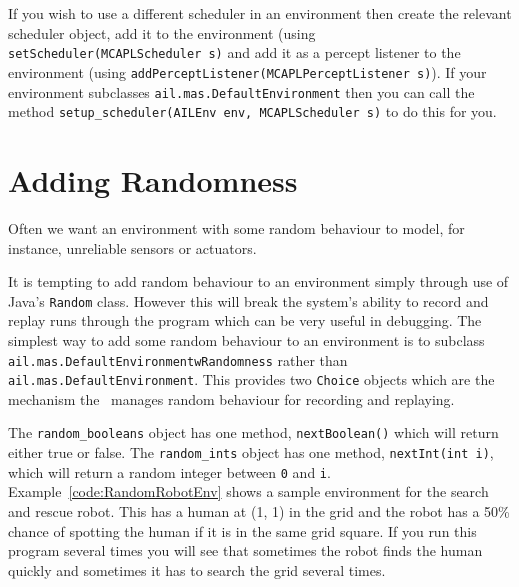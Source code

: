 \begin{sloppypar}
If you wish to use a different scheduler in an environment then create the relevant scheduler object, add it to the environment (using \texttt{setScheduler(MCAPLScheduler s)} and add it as a percept listener to the environment (using \texttt{addPerceptListener(MCAPLPerceptListener s)}).  If your environment subclasses \texttt{ail.mas.DefaultEnvironment} then you can call the method \texttt{setup\_scheduler(AILEnv env, MCAPLScheduler s)} to do this for you.
\end{sloppypar}

\section{Adding Randomness}

Often we want an environment with some random behaviour to model, for instance, unreliable sensors or actuators.

\begin{sloppypar}
It is tempting to add random behaviour to an environment simply through use of Java's \texttt{Random} class.  However this will break the system's ability to record and replay runs through the program which can be very useful in debugging.  The simplest way to add some random behaviour to an environment is to subclass \texttt{ail.mas.DefaultEnvironmentwRandomness} rather than \texttt{ail.mas.DefaultEnvironment}.  This provides two \texttt{Choice} objects which are the mechanism the \ail\ manages random behaviour for recording and replaying.
\end{sloppypar}

The \texttt{random\_booleans} object has one method, \texttt{nextBoolean()} which will return either true or false.  The \texttt{random\_ints} object has one method, \texttt{nextInt(int i)}, which will return a random integer between \texttt{0} and \texttt{i}.  Example~\ref{code:RandomRobotEnv} shows a sample environment for the search and rescue robot.  This has a human at (1, 1) in the grid and the robot has a 50\% chance of spotting the human if it is in the same grid square.   If you run this program several times you will see that sometimes the robot finds the human quickly and sometimes it has to search the grid several times.

